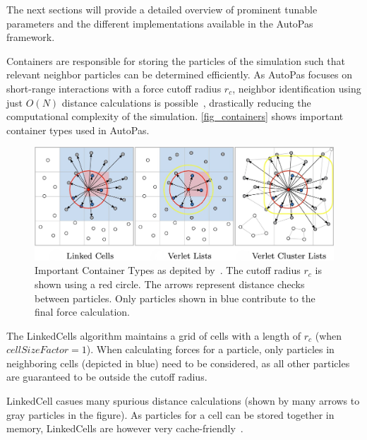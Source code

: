 \documentclass[conference]{IEEEtran}
\begin{document}
The next sections will provide a detailed overview of prominent tunable parameters and the different implementations available in the AutoPas framework.

\begin{description}[style=nextline]
    \item[Container]

        Containers are responsible for storing the particles of the simulation such that relevant neighbor particles can be determined efficiently. As AutoPas focuses on short-range interactions with a force cutoff radius $r_c$, neighbor identification using just $O(N)$ distance calculations is possible~\cite{Gratl2019AutoPas}, drastically reducing the computational complexity of the simulation. \autoref{fig_containers} shows important container types used in AutoPas.

        \begin{figure}[h]
            \centering
            \includegraphics[width=\columnwidth]{figures/containers.jpg}
            \caption{Important Container Types as depited by~\cite{Gratl2022AutoPas}. The cutoff radius $r_c$ is shown using a red circle. The arrows represent distance checks between particles. Only particles shown in blue contribute to the final force calculation.}
            \label{fig_containers}
        \end{figure}

        \begin{description}[style=nextline, font=\itshape\mdseries]
            \item[LinkedCells]
                The LinkedCells algorithm maintains a grid of cells with a length of $r_c$ (when $cellSizeFactor = 1$). When calculating forces for a particle, only particles in neighboring cells (depicted in blue) need to be considered, as all other particles are guaranteed to be outside the cutoff radius.

                LinkedCell casues many spurious distance calculations (shown by many arrows to gray particles in the figure). As particles for a cell can be stored together in memory, LinkedCells are however very cache-friendly~\cite{Gratl2022AutoPas}.


\end{description}
\end{description}
\end{document}

